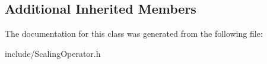 \subsection*{Additional Inherited Members}


The documentation for this class was generated from the following file\+:\begin{DoxyCompactItemize}
\item 
include/Scaling\+Operator.\+h\end{DoxyCompactItemize}
